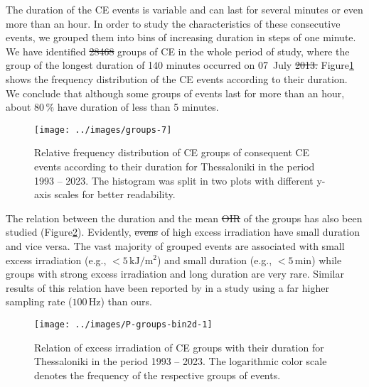 \documentclass[preprint, 5p,
authoryear]{elsarticle} %
\providecommand{\DIFaddtex}[1]{{\protect\color{blue}\uwave{#1}}} %
\providecommand{\DIFdeltex}[1]{{\protect\color{red}\sout{#1}}}                      %
\providecommand{\DIFaddbegin}{} %
\providecommand{\DIFaddend}{} %
\providecommand{\DIFdelbegin}{} %
\providecommand{\DIFdelend}{} %
\providecommand{\DIFadd}[1]{\texorpdfstring{\DIFaddtex{#1}}{#1}} %
\providecommand{\DIFdel}[1]{\texorpdfstring{\DIFdeltex{#1}}{}} %
\newcommand{\DIFscaledelfig}{0.5}
\newlength{\DIFdelgraphicswidth} %
\newlength{\DIFdelgraphicsheight} %
\newcommand{\DIFaddincludegraphics}[2][]{{\color{blue}\fbox{\DIFOincludegraphics[#1]{#2}}}} %
\newcommand{\DIFdelincludegraphics}[2][]{%
\sbox{\DIFdelgraphicsbox}{\DIFOincludegraphics[#1]{#2}}%
\settoboxwidth{\DIFdelgraphicswidth}{\DIFdelgraphicsbox} %
\settoboxtotalheight{\DIFdelgraphicsheight}{\DIFdelgraphicsbox} %
\scalebox{\DIFscaledelfig}{%
\parbox[b]{\DIFdelgraphicswidth}{\usebox{\DIFdelgraphicsbox}\\[-\baselineskip] \rule{\DIFdelgraphicswidth}{0em}}\llap{\resizebox{\DIFdelgraphicswidth}{\DIFdelgraphicsheight}{%
\setlength{\unitlength}{\DIFdelgraphicswidth}%
\begin{picture}(1,1)%
\thicklines\linethickness{2pt} %
{\color[rgb]{1,0,0}\put(0,0){\framebox(1,1){}}}%
{\color[rgb]{1,0,0}\put(0,0){\line( 1,1){1}}}%
{\color[rgb]{1,0,0}\put(0,1){\line(1,-1){1}}}%
\end{picture}%
}\hspace*{3pt}}} %
} %
\DeclareRobustCommand{\DIFaddbegin}{\DIFOaddbegin \let\includegraphics\DIFaddincludegraphics} %
\DeclareRobustCommand{\DIFaddend}{\DIFOaddend \let\includegraphics\DIFOincludegraphics} %
\DeclareRobustCommand{\DIFdelbegin}{\DIFOdelbegin \let\includegraphics\DIFdelincludegraphics} %
\DeclareRobustCommand{\DIFdelend}{\DIFOaddend \let\includegraphics\DIFOincludegraphics} %
\begin{document}
The duration of the CE events is variable and can last for several
minutes or even more than an hour. In order to study the characteristics
of these consecutive events, we grouped them into bins of increasing
duration in steps of one minute. We have identified \DIFdelbegin \DIFdel{28468 }\DIFdelend \DIFaddbegin \DIFadd{28182 }\DIFaddend groups of CE
in the whole period of study, where the group of the longest duration of
140 minutes occurred on 07~July \DIFdelbegin \DIFdel{2013.
}\DIFdelend \DIFaddbegin \DIFadd{2013 in a SZA range of \(52.1^\circ\) --
\(77.9^\circ\). }\DIFaddend Figure\nobreakspace{}\ref{fig:ceg-duration-distribution}
shows the frequency distribution of the CE events according to their
duration. We conclude that although some groups of events last for more
than an hour, about \(80\,\%\) have duration of less than 5 minutes.

\begin{figure}

{\centering \texttt{[image: ../images/groups-7]} 

}

\caption{Relative frequency distribution of CE groups of consequent CE events according to their duration for Thessaloniki in the period 1993 -- 2023. The histogram was split in two plots with different y-axis scales for better readability.}\label{fig:ceg-duration-distribution}
\end{figure}

The relation between the duration and the mean \DIFdelbegin \DIFdel{OIR }\DIFdelend \DIFaddbegin \DIFadd{OI }\DIFaddend of the groups has also
been studied (Figure\nobreakspace{}\ref{fig:group-2d}). Evidently,
\DIFdelbegin \DIFdel{evens }\DIFdelend \DIFaddbegin \DIFadd{events }\DIFaddend of high excess irradiation have small duration and vice versa.
The vast majority of grouped events are associated with small excess
irradiation (e.g., \(<5\,\text{kJ}/\text{m}^2\)) and small duration
(e.g., \(<5\,\text{min}\)) while groups with strong excess irradiation
and long duration are very rare. Similar results of this relation have
been reported by \citet{Zhang2018} in a study using a far higher
sampling rate (\(100\,\text{Hz}\)) than ours.

\begin{figure}

{\centering \texttt{[image: ../images/P-groups-bin2d-1]} 

}

\caption{Relation of excess irradiation of CE groups with their duration for Thessaloniki in the period 1993 -- 2023. The logarithmic color scale denotes the frequency of the respective groups of events.}\label{fig:group-2d}
\end{figure}
\end{document}
